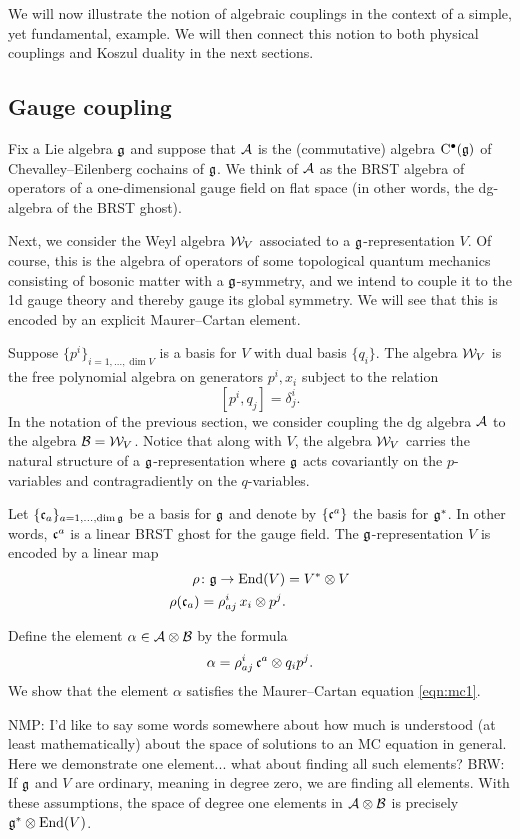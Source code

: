 \documentclass[11pt]{amsart}
\def\brian#1{{\textcolor{blue!65!red}{BRW: {#1}}}}
\def\natalie#1{{\textcolor{green!65!black}{NMP: {#1}}}}
\begin{document}
We will now illustrate the notion of algebraic couplings in the context of a simple, yet fundamental, example. We will then connect this notion to both physical couplings and Koszul duality in the next sections. 

\subsection{Gauge coupling} \label{sec:gaugealg}

Fix a Lie algebra $\mathfrak g$ and
suppose that $\mathcal A$ is the (commutative) algebra ${\rm C}^\bullet(\mathfrak g)$ of Chevalley--Eilenberg cochains of $\mathfrak g$. 
We think of $\mathcal A$ as the BRST algebra of operators of a one-dimensional gauge field on flat space (in other words, the dg-algebra of the BRST ghost). 

Next, we consider the Weyl algebra $\mathcal W_V$ associated to a $\mathfrak g$-representation $V$. Of course, this is the algebra of operators of some topological quantum mechanics consisting of bosonic matter with a $\mathfrak g$-symmetry, and we intend to couple it to the 1d gauge theory and thereby gauge its global symmetry.
We will see that this is encoded by an explicit Maurer--Cartan element. 

Suppose $\{p^i\}_{i=1,\ldots,\dim V}$ is a basis for $V$ with dual basis $\{q_i\}$. 
The algebra $\mathcal W_V$ is the free polynomial algebra on generators $p^i, x_i$ subject to the relation 
\[
[p^i, q_j] = \delta_j^i .
\]
In the notation of the previous section, we consider coupling the dg algebra $\mathcal A$ to the algebra $\mathcal B = \mathcal W_V$. 
Notice that along with $V$, the algebra $\mathcal W_V$ carries the natural structure of a $\mathfrak g$-representation where $\mathfrak g$ acts covariantly on the $p$-variables and contragradiently on the $q$-variables. 

Let $\{\mathfrak c_a\}_{a=1,\dots,\dim \mathfrak g}$ be a basis for $\mathfrak g$ and denote by $\{\mathfrak c^a\}$ the basis for $\mathfrak g^*$. 
In other words, $\mathfrak c^a$ is a linear BRST ghost for the gauge field. 
The $\mathfrak g$-representation $V$ is encoded by a linear map
\begin{align*}
\rho & \colon \mathfrak g \to {\rm End}(V) = V^* \otimes V \\
\rho(\mathfrak c_a) & = \rho_{aj}^i \, x_i \otimes p^j .
\end{align*}

Define the element $\alpha \in \mathcal A \otimes \mathcal B$ by the formula
\[
\alpha = \rho_{aj}^i \, \mathfrak c^a \otimes q_i p^j .
\]
We show that the element $\alpha$ satisfies the Maurer--Cartan equation \eqref{eqn:mc1}. 

\natalie{I'd like to say some words somewhere about how much is understood (at least mathematically) about the space of solutions to an MC equation in general. Here we demonstrate one element... what about finding all such elements?}
\brian{If $\mathfrak g$ and $V$ are ordinary, meaning in degree zero, we are finding all elements. 
With these assumptions, the space of degree one elements in $\mathcal A \otimes \mathcal B$ is precisely $\mathfrak g^* \otimes {\rm End}(V)$.}
\end{document}
